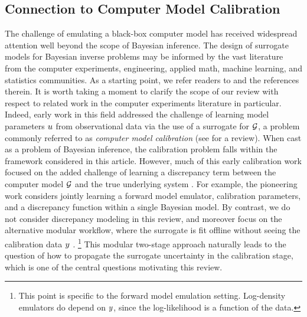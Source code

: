 \documentclass[12pt]{article}
\begin{document}
\subsection{Connection to Computer Model Calibration} \label{computer_calibration_connection}
The challenge of emulating a black-box computer model has received widespread attention 
well beyond the scope of Bayesian inference. The design of surrogate models for Bayesian 
inverse problems may be informed by the vast literature from the computer experiments, 
engineering, applied math, machine learning, and statistics communities. As a starting point, 
we refer readers to \citet{gramacy2020surrogates,design_analysis_computer_experiments,SanterCompExp,UQpredCompSci} 
and the references therein. It is worth taking a moment to clarify the scope of our review 
with respect to related work in the computer experiments literature in particular.
Indeed, early work in this field addressed the challenge of learning 
model parameters  $u$ from observational data via the use of a surrogate for $\mathcal{G}$, a problem 
commonly referred to as \textit{computer model calibration} (see \citet{computerModelCalibrationReview}
for a review). When cast as a problem of Bayesian inference, the calibration problem falls within the 
framework considered in this article. However, much of this early calibration work focused on 
the added challenge of learning a discrepancy term between the computer model $\mathcal{G}$ and the 
true underlying system \citep{ModelDiscrepancy,emPostDens,OakleyllikEm}. 
For example, the pioneering work \citet{KOH} considers jointly learning 
a forward model emulator, calibration parameters, and a discrepancy function within a single 
Bayesian model. By contrast, we do not consider discrepancy modeling in this review, and moreover
focus on the alternative modular workflow, where the surrogate is fit offline 
without seeing the calibration data $y$ \citep{modularization}. 
\footnote{This point is specific to the forward model emulation setting. Log-density emulators 
do depend on $y$, since the log-likelihood is a function of the data.}
This modular two-stage approach naturally leads to 
the question of how to propagate the surrogate uncertainty in the calibration stage, which is one 
of the central questions motivating this review.
\end{document}
